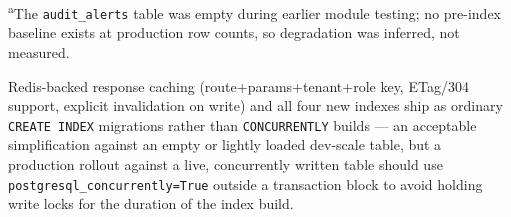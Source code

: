 \begin{table}[t]
  \centering
  \scriptsize
  \caption{Module 7 query optimization, before/after \texttt{EXPLAIN (ANALYZE, BUFFERS)} on a bulk-seeded dev database. Row 3 is reported as a genuine non-win, not silently dropped.}
  \label{tab:queries}
\end{table}
\vspace{-0.6em}
{\scriptsize\textsuperscript{a}The \texttt{audit\_alerts} table was empty during earlier module testing; no pre-index baseline exists at production row counts, so degradation was inferred, not measured.\par}

Redis-backed response caching (route+params+tenant+role key, ETag/304 support, explicit invalidation on write) and all four new indexes ship as ordinary \texttt{CREATE INDEX} migrations rather than \texttt{CONCURRENTLY} builds — an acceptable simplification against an empty or lightly loaded dev-scale table, but a production rollout against a live, concurrently written table should use \texttt{postgresql\_concurrently=True} outside a transaction block to avoid holding write locks for the duration of the index build.

